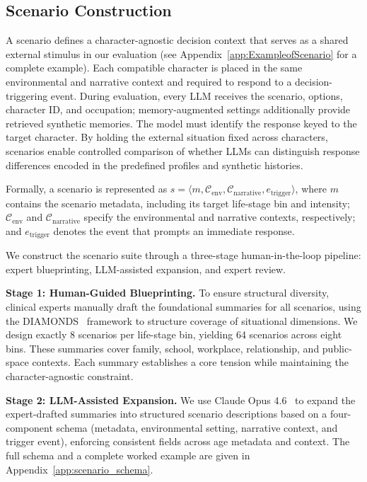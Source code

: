 \documentclass[11pt]{article}
\begin{document}
\subsection{Scenario Construction}
\label{sec:scenario}

A scenario defines a character-agnostic decision context that serves as a shared external stimulus in our evaluation (see Appendix~\ref{app:ExampleofScenario} for a complete example). Each compatible character is placed in the same environmental and narrative context and required to respond to a decision-triggering event. During evaluation, every LLM receives the scenario, options, character ID, and occupation; memory-augmented settings additionally provide retrieved synthetic memories. The model must identify the response keyed to the target character. By holding the external situation fixed across characters, scenarios enable controlled comparison of whether LLMs can distinguish response differences encoded in the predefined profiles and synthetic histories.

Formally, a scenario is represented as $s=\langle m,\mathcal{C}_{\mathrm{env}},\mathcal{C}_{\mathrm{narrative}},e_{\mathrm{trigger}}\rangle$, where $m$ contains the scenario metadata, including its target life-stage bin and intensity; $\mathcal{C}_{\mathrm{env}}$ and $\mathcal{C}_{\mathrm{narrative}}$ specify the environmental and narrative contexts, respectively; and $e_{\mathrm{trigger}}$ denotes the event that prompts an immediate response.

We construct the scenario suite through a three-stage human-in-the-loop pipeline: expert blueprinting, LLM-assisted expansion, and expert review.

\textbf{Stage 1: Human-Guided Blueprinting.} 
To ensure structural diversity, clinical experts manually draft the foundational summaries for all scenarios, using the DIAMONDS~\cite{rauthmann2014diamonds} framework to structure coverage of situational dimensions. We design exactly 8 scenarios per life-stage bin, yielding 64 scenarios across eight bins. These summaries cover family, school, workplace, relationship, and public-space contexts. Each summary establishes a core tension while maintaining the character-agnostic constraint.

\textbf{Stage 2: LLM-Assisted Expansion.}
We use Claude Opus 4.6~\cite{anthropic2026opus46} to expand the expert-drafted summaries into structured scenario descriptions based on a four-component schema (metadata, environmental setting, narrative context, and trigger event), enforcing consistent fields across age metadata and context. The full schema and a complete worked example are given in Appendix~\ref{app:scenario_schema}.
\end{document}
